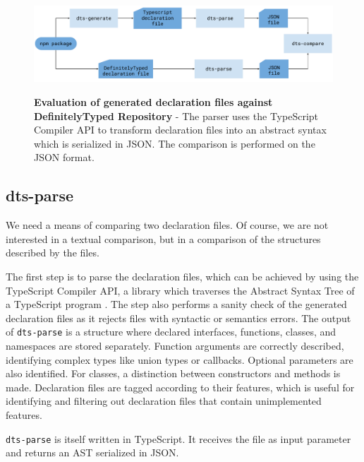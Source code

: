 \documentclass[english,cleveref,autoref,submission]{programming}
\begin{document}
\begin{figure}[tp]
    \begin{centering}
        {\includegraphics[width=1\textwidth]{evaluation-diagram.pdf}}
        \caption[Evaluation against DefinitelyTyped Repository]{\textbf{Evaluation of
            generated declaration files against DefinitelyTyped Repository} - The parser
          uses the TypeScript Compiler           API \cite{typescript-compiler-api} to
          transform declaration files into an abstract syntax which is serialized in
          JSON. The comparison is performed on the JSON format.} 
        \label{fig:evaluation-diagram}
    \end{centering}
\end{figure}

\subsection{dts-parse}
\label{sec:dts-parse}
We need a means of comparing two declaration files. Of
course, we are not interested in a textual comparison, but in a
comparison of the structures described by the files.

The first step is to parse the declaration files, which can be
achieved by using the TypeScript Compiler API, a library which traverses the
Abstract Syntax Tree of a TypeScript program
\cite{typescript-compiler-api}. 
The step also performs a sanity check of the generated declaration
files as it rejects files with syntactic or semantics errors.
The output of \texttt{dts-parse} is a structure where declared
{interfaces}, {functions}, {classes}, and
{namespaces} are stored separately. Function arguments are
correctly described, identifying complex types like union types or
callbacks. Optional parameters are also identified. For
{classes}, a distinction between constructors and methods
is made. Declaration files are tagged according to their features,
which is useful for identifying and filtering out declaration files
that contain unimplemented features.

\texttt{dts-parse} is itself written in TypeScript. It receives the file as input
parameter and returns an AST serialized in JSON.
\end{document}
